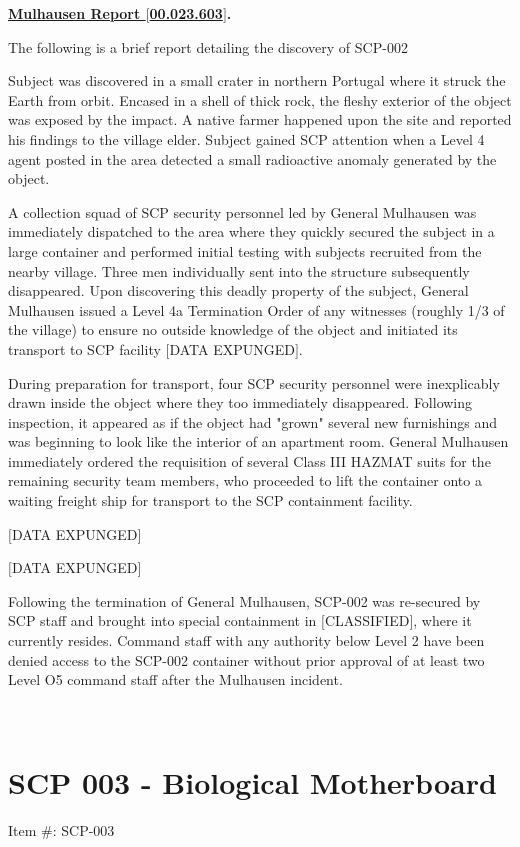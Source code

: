 \documentclass[a4paper, 11pt]{article}
\newenvironment{bordered}[1]%
{\begin{boxedminipage}{\textwidth}\textbf{\underline{#1}.}}
{\end{boxedminipage}\\[1em]}
\newcommand{\lb}{\ensuremath{[}}
\newcommand{\rb}{\ensuremath{]}}
\newcommand{\expunged}{\lb DATA EXPUNGED\rb}
\newcommand{\classified}{\lb CLASSIFIED\rb}
\begin{document}
\begin{bordered}{Mulhausen Report \lb 00.023.603\rb}

The following is a brief report detailing the discovery of SCP-002

Subject was discovered in a small crater in northern Portugal where it struck the Earth from orbit. Encased in a shell of thick rock, the fleshy exterior of the object was exposed by the impact. A native farmer happened upon the site and reported his findings to the village elder. Subject gained SCP attention when a Level 4 agent posted in the area detected a small radioactive anomaly generated by the object.

A collection squad of SCP security personnel led by General Mulhausen was immediately dispatched to the area where they quickly secured the subject in a large container and performed initial testing with subjects recruited from the nearby village. Three men individually sent into the structure subsequently disappeared. Upon discovering this deadly property of the subject, General Mulhausen issued a Level 4a Termination Order of any witnesses (roughly 1/3 of the village) to ensure no outside knowledge of the object and initiated its transport to SCP facility \expunged.

During preparation for transport, four SCP security personnel were inexplicably drawn inside the object where they too immediately disappeared. Following inspection, it appeared as if the object had "grown" several new furnishings and was beginning to look like the interior of an apartment room. General Mulhausen immediately ordered the requisition of several Class III HAZMAT suits for the remaining security team members, who proceeded to lift the container onto a waiting freight ship for transport to the SCP containment facility.

\expunged

\expunged

Following the termination of General Mulhausen, SCP-002 was re-secured by SCP staff and brought into special containment in \classified, where it currently resides. Command staff with any authority below Level 2 have been denied access to the SCP-002 container without prior approval of at least two Level O5 command staff after the Mulhausen incident.

\end{bordered}

\section{SCP 003 - Biological Motherboard}
Item \#: SCP-003
\end{document}
